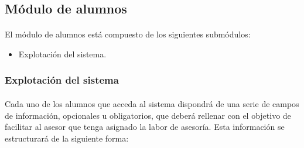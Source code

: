    \subsection{Módulo de alumnos}\label{modAlumnos}

      \paragraph{}El módulo de alumnos está compuesto de los siguientes
      submódulos:

      \begin{itemize}
       \item Explotación del sistema.
      \end{itemize}

      \subsubsection{Explotación del sistema}

      \paragraph{}Cada uno de los alumnos que acceda al sistema dispondrá
      de una serie de campos de información, opcionales u obligatorios, que
      deberá rellenar con el objetivo de facilitar al asesor que tenga asignado
      la labor de asesoría. Esta información se estructurará de la siguiente
      forma:

